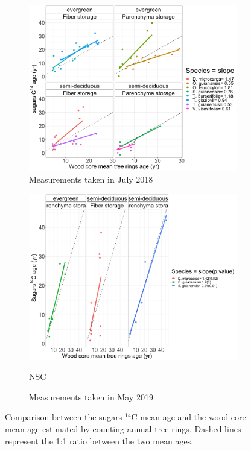 \documentclass{article}
\begin{document}
\begin{figure}[h] %
   \centering
   \begin{subfigure}{0.7\textwidth}
   \includegraphics[width=\textwidth]{means_Age_wood_vs_mean_age_sugars_leaf_habit.png} 
   	\caption{Measurements taken in July 2018}
          \label{fig:Jul18} 
       \end{subfigure}
	 \begin{subfigure}{0.7\textwidth}
   \includegraphics[width=\textwidth]{means_Age_wood_vs_mean_age_sugars_leaf_habit_may2019.png} 
   	\caption{Measurements taken in May 2019}
          	\label{fig:May19} NSC
	\end{subfigure}
   \caption{Comparison between the sugars $^{14}$C mean age and the wood core mean age estimated by counting annual tree rings. Dashed lines represent the 1:1 ratio between the two mean ages. }
   \label{fig:wood_Age_sugar_age}
\end{figure}	
\end{document}
